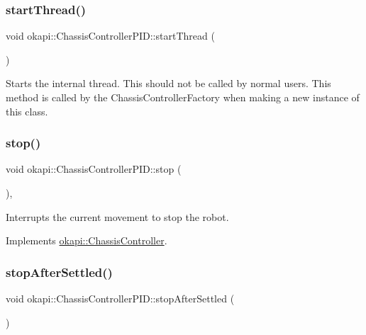 \subsubsection{\texorpdfstring{startThread()}{startThread()}}
{\footnotesize\ttfamily void okapi\+::\+Chassis\+Controller\+P\+I\+D\+::start\+Thread (\begin{DoxyParamCaption}{ }\end{DoxyParamCaption})}

Starts the internal thread. This should not be called by normal users. This method is called by the Chassis\+Controller\+Factory when making a new instance of this class. \mbox{\label{classokapi_1_1ChassisControllerPID_a852462fc20fb2322bbb3fd984b01a121}} 
\subsubsection{\texorpdfstring{stop()}{stop()}}
{\footnotesize\ttfamily void okapi\+::\+Chassis\+Controller\+P\+I\+D\+::stop (\begin{DoxyParamCaption}{ }\end{DoxyParamCaption})\hspace{0.3cm}{\ttfamily [override]}, {\ttfamily [virtual]}}

Interrupts the current movement to stop the robot. 

Implements \mbox{\hyperlink{classokapi_1_1ChassisController_ac67edbbbe1c8480c4503b9875a3719cd}{okapi\+::\+Chassis\+Controller}}.

\mbox{\label{classokapi_1_1ChassisControllerPID_ac8dffc9df4025ece0303194a0fbc58ff}} 
\subsubsection{\texorpdfstring{stopAfterSettled()}{stopAfterSettled()}}
{\footnotesize\ttfamily void okapi\+::\+Chassis\+Controller\+P\+I\+D\+::stop\+After\+Settled (\begin{DoxyParamCaption}{ }\end{DoxyParamCaption})\hspace{0.3cm}{\ttfamily [protected]}}

